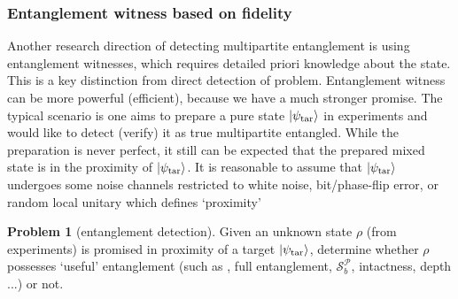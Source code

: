 \documentclass[
reprint,
aps,
pra,
floatfix,
]{revtex4-2}
\theoremstyle{plain}
\theoremstyle{definition}
\newtheorem{problem}{Problem}
\newtheorem{remark}{Remark}
\newcommand{\dm}{\rho}
\newcommand{\target}{\textup{tar}}
\newcommand{\separable}{\mathcal{S}}
\newcommand{\ppartition}{\mathcal{P}}
\begin{document}


\subsubsection{Entanglement witness based on fidelity}\label{sec:entanglement_witness}
Another research direction of detecting multipartite entanglement is using entanglement witnesses,
which requires detailed priori knowledge about the state.
This is a key distinction from direct detection of  problem. 
Entanglement witness can be more powerful (efficient), because we have a much stronger promise.
The typical scenario is one aims to prepare a pure state $\ket{\psi_\target}$ in experiments and would like to detect (verify) it as true multipartite entangled. 
While the preparation is never perfect, it still can be expected that the prepared mixed state is in the proximity of $\ket{\psi_\target}$. 
It is reasonable to assume that $\ket{\psi_{\target}}$ undergoes some noise channels restricted to white noise, bit/phase-flip error, or random local unitary which defines `proximity'
\begin{problem}[entanglement detection]\label{prm:entanglement_detection}
	Given an unknown state $\dm$ (from experiments) is promised in proximity of a target $\ket{\psi_{\target}}$, 
	determine whether $\dm$ possesses `useful' entanglement (such as , full entanglement, $\separable_b^\ppartition$, intactness, depth ...) or not.
\end{problem}
	
\end{document}
